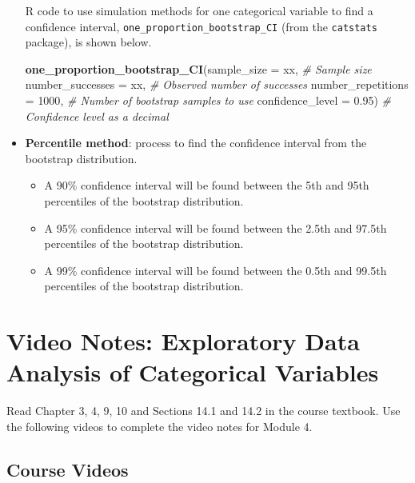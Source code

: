 \documentclass[
]{report}
\newenvironment{Shaded}{\begin{snugshade}}{\end{snugshade}}
\newcommand{\AttributeTok}[1]{\textcolor[rgb]{0.13,0.29,0.53}{#1}}
\newcommand{\CommentTok}[1]{\textcolor[rgb]{0.56,0.35,0.01}{\textit{#1}}}
\newcommand{\DecValTok}[1]{\textcolor[rgb]{0.00,0.00,0.81}{#1}}
\newcommand{\FloatTok}[1]{\textcolor[rgb]{0.00,0.00,0.81}{#1}}
\newcommand{\FunctionTok}[1]{\textcolor[rgb]{0.13,0.29,0.53}{\textbf{#1}}}
\newcommand{\NormalTok}[1]{#1}
\begin{document}
\begin{itemize}
  R code to use simulation methods for one categorical variable to find a confidence interval, \texttt{one\_proportion\_bootstrap\_CI} (from the \texttt{catstats} package), is shown below.

\begin{Shaded}
\begin{Highlighting}[]
\FunctionTok{one\_proportion\_bootstrap\_CI}\NormalTok{(}\AttributeTok{sample\_size =}\NormalTok{ xx, }\CommentTok{\# Sample size}
                \AttributeTok{number\_successes =}\NormalTok{ xx, }\CommentTok{\# Observed number of successes}
                \AttributeTok{number\_repetitions =} \DecValTok{1000}\NormalTok{, }\CommentTok{\# Number of bootstrap samples to use}
                \AttributeTok{confidence\_level =} \FloatTok{0.95}\NormalTok{) }\CommentTok{\# Confidence level as a decimal}
\end{Highlighting}
\end{Shaded}
\item
  \textbf{Percentile method}: process to find the confidence interval from the bootstrap distribution.

  \begin{itemize}
  \item
    A 90\% confidence interval will be found between the 5th and 95th percentiles of the bootstrap distribution.
  \item
    A 95\% confidence interval will be found between the 2.5th and 97.5th percentiles of the bootstrap distribution.
  \item
    A 99\% confidence interval will be found between the 0.5th and 99.5th percentiles of the bootstrap distribution.
  \end{itemize}
\end{itemize}

\newpage

\section{Video Notes: Exploratory Data Analysis of Categorical Variables}\label{video-notes-exploratory-data-analysis-of-categorical-variables}

Read Chapter 3, 4, 9, 10 and Sections 14.1 and 14.2 in the course textbook. Use the following videos to complete the video notes for Module 4.

\subsection{Course Videos}\label{course-videos-2}
\end{document}
